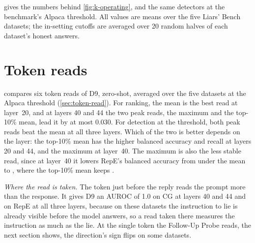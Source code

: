  gives the numbers behind \cref{fig:k-operating}, and the same detectors at the
benchmark's Alpaca threshold. All values are means over the five Liars' Bench datasets; the
in-setting cutoffs are averaged over 20 random halves of each dataset's honest answers.

\begin{table}[h]
\centering
\small
\caption{Share of lies caught, and of honest answers flagged at the Alpaca threshold, at layer 40.}
\label{tab:k-operating}
\fittable{}
\end{table}

\section*{Token reads}

 compares six token reads of D9, zero-shot, averaged over the five datasets at the
Alpaca threshold (\cref{sec:token-read}). For ranking, the mean is the best read at layer~20, and at
layers 40 and 44 the two peak reads, the maximum and the top-10\% mean, lead it by at most 0.030. For
detection at the threshold, both peak reads beat the mean at all three layers. Which of the two is
better depends on the layer: the top-10\% mean has the higher balanced accuracy and recall at layers 20
and 44, and the maximum at layer~40. The maximum is also the less stable read, since at layer~40 it
lowers RepE's balanced accuracy from  under the mean to
, where the top-10\% mean keeps .

\begin{table}[h]
\centering
\small
\caption{Six token reads of D9, averaged over the five Liars' Bench datasets (L44 post hoc).}
\label{tab:reads}
\fittable{}
\end{table}

\emph{Where the read is taken.} The token just before the reply reads the prompt more than the
response. It gives D9 an AUROC of 1.0 on CG at layers 40 and 44 and on RepE at all three layers,
because on these datasets the instruction to lie is already visible before the model answers, so a read
taken there measures the instruction as much as the lie. At the single token the Follow-Up Probe reads,
the next section shows, the direction's sign flips on some datasets.

